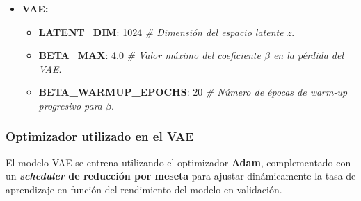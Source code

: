 \begin{itemize}
  \item \textbf{VAE:}
  \begin{itemize}
    \item \textbf{LATENT\_DIM}: 1024 \emph{\# Dimensión del espacio latente $z$}.
    \item \textbf{BETA\_MAX}: 4.0 \emph{\# Valor máximo del coeficiente $\beta$ en la pérdida del VAE}.
    \item \textbf{BETA\_WARMUP\_EPOCHS}: 20 \emph{\# Número de épocas de \textit{warm-up} progresivo para $\beta$}.
  \end{itemize}

\end{itemize}

\subsubsection*{Optimizador utilizado en el VAE}

El modelo VAE se entrena utilizando el optimizador \textbf{Adam}, complementado con un \textbf{\emph{scheduler} de reducción por meseta} para ajustar dinámicamente la tasa de aprendizaje en función del rendimiento del modelo en validación.

